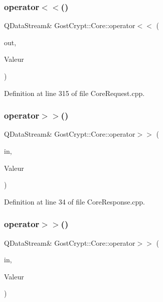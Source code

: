 \subsubsection{\texorpdfstring{operator$<$$<$()}{operator<<()}\hspace{0.1cm}{\footnotesize\ttfamily [56/56]}}
{\footnotesize\ttfamily Q\+Data\+Stream\& Gost\+Crypt\+::\+Core\+::operator$<$$<$ (\begin{DoxyParamCaption}\item[{Q\+Data\+Stream \&}]{out,  }\item[{const \hyperlink{struct_gost_crypt_1_1_core_1_1_benchmark_algorithms_request}{Benchmark\+Algorithms\+Request} \&}]{Valeur }\end{DoxyParamCaption})}



Definition at line 315 of file Core\+Request.\+cpp.

\mbox{\label{namespace_gost_crypt_1_1_core_a6ae08cb8ec68babaaa0e43ce9b5a965c}} 
\subsubsection{\texorpdfstring{operator$>$$>$()}{operator>>()}\hspace{0.1cm}{\footnotesize\ttfamily [1/56]}}
{\footnotesize\ttfamily Q\+Data\+Stream\& Gost\+Crypt\+::\+Core\+::operator$>$$>$ (\begin{DoxyParamCaption}\item[{Q\+Data\+Stream \&}]{in,  }\item[{\hyperlink{struct_gost_crypt_1_1_core_1_1_core_response}{Core\+Response} \&}]{Valeur }\end{DoxyParamCaption})}



Definition at line 34 of file Core\+Response.\+cpp.

\mbox{\label{namespace_gost_crypt_1_1_core_aac2d5f84e6391bfc526e3350db4744dd}} 
\subsubsection{\texorpdfstring{operator$>$$>$()}{operator>>()}\hspace{0.1cm}{\footnotesize\ttfamily [2/56]}}
{\footnotesize\ttfamily Q\+Data\+Stream\& Gost\+Crypt\+::\+Core\+::operator$>$$>$ (\begin{DoxyParamCaption}\item[{Q\+Data\+Stream \&}]{in,  }\item[{\hyperlink{struct_gost_crypt_1_1_core_1_1_core_request}{Core\+Request} \&}]{Valeur }\end{DoxyParamCaption})}



